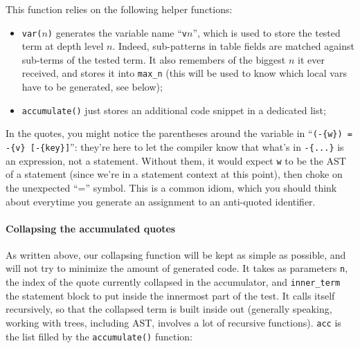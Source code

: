 This function relies on the following helper functions:
\begin{itemize}
\item {\tt var($n$)} generates the variable name ``\verb|v|$n$'', which
  is used to store the tested term at depth level $n$. Indeed,
  sub-patterns in table fields are matched against sub-terms of the
  tested term. It also remembers of the biggest $n$  it ever received, 
  and stores it into \verb|max_n| (this will be used to know which
  local vars have to be generated, see below);
\item {\tt accumulate()} just stores an additional code snippet in a
  dedicated list;
\end{itemize}

In the quotes, you might notice the parentheses around the variable in
``\verb|(-{w}) = -{v} [-{key}]|'': they're here to let the compiler
know that what's in \verb|-{...}| is an expression, not a
statement. Without them, it would expect {\tt w} to be the AST of a
statement (since we're in a statement context at this point), then
choke on the unexpected ``='' symbol. This is a common idiom, which
you should think about everytime you generate an assignment to an
anti-quoted identifier.

\paragraph{Collapsing the accumulated quotes}
As written above, our collapsing function will be kept as simple
as possible, and will not try to minimize the amount of generated
code. It takes as parameters {\tt n}, the index of the quote currently
collapsed in the accumulator, and {\tt inner\_term} the statement
block to put inside the innermost part of the test. It calls itself
recursively, so that the collapsed term is built inside out (generally
speaking, working with trees, including AST, involves a lot of
recursive functions). \verb|acc| is the list filled by the
\verb|accumulate()| function:

